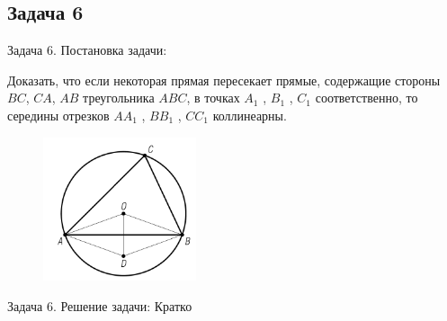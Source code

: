 \documentclass{beamer}
\begin{document}
\begin{frame}
   \subsection{Задача 6}
   \begin{block}{Задача 6. Постановка задачи:}


      Доказать, что если некоторая прямая пересекает прямые, содержащие стороны \(BC\), \(CA\), \(AB\) треугольника \(ABC\), в точках \(A_1\) , \(B_1\) , \(C_1\) соответственно, то середины отрезков \(AA_1\) , \(BB_1\) , \(CC_1\) коллинеарны.

      \begin{figure}[h]
         \centering
         \includegraphics[width=0.4\textwidth]{images/task1.png}
         \label{task6}
      \end{figure}
   \end{block}
\end{frame}

\begin{frame}
   \begin{block}{Задача 6. Решение задачи:}
      Кратко
   \end{block}
\end{frame}
\end{document}
